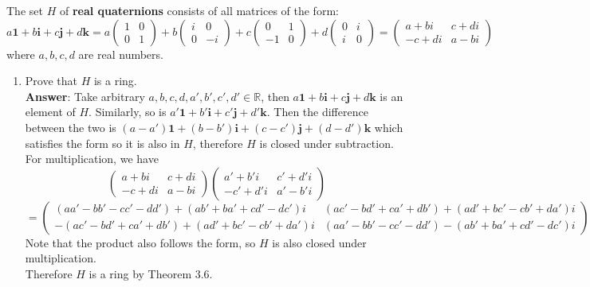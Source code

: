 \documentclass{article}
\begin{document}
\begin{enumerate}
            The set $H$ of {\bf real quaternions} consists of all matrices of the form:
            \[
                  a\textbf{1}+b\textbf{i}+c\textbf{j}+d\textbf{k} = a\begin{pmatrix}1&0\\0&1\end{pmatrix}+b\begin{pmatrix}i&0\\0&-i\end{pmatrix}+c\begin{pmatrix}0&1\\-1&0\end{pmatrix}+d\begin{pmatrix}0&i\\i&0\end{pmatrix}
                  = \begin{pmatrix}a+bi&c+di\\-c+di&a-bi\end{pmatrix}
            \]
            where $a,b,c,d$ are real numbers.
            \begin{enumerate}[start=2]
                  \item Prove that $H$ is a ring.\\
                        \textbf{Answer}: Take arbitrary $a,b,c,d,a',b',c',d'\in\mathbb{R}$, then $a\textbf{1}+b\textbf{i}+c\textbf{j}+d\textbf{k}$ is an element of $H$. Similarly, so is $a'\textbf{1}+b'\textbf{i}+c'\textbf{j}+d'\textbf{k}$. Then the difference between the two is $(a-a')\textbf{1}+(b-b')\textbf{i}+(c-c')\textbf{j}+(d-d')\textbf{k}$ which satisfies the form so it is also in $H$, therefore $H$ is closed under subtraction.\\
                        For multiplication, we have \[\begin{pmatrix}a+bi&c+di\\-c+di&a-bi\end{pmatrix}\begin{pmatrix}a'+b'i&c'+d'i\\-c'+d'i&a'-b'i\end{pmatrix}\]\[=\begin{pmatrix}(aa'-bb'-cc'-dd')+(ab'+ba'+cd'-dc')i&(ac'-bd'+ca'+db')+(ad'+bc'-cb'+da')i\\-(ac'-bd'+ca'+db')+(ad'+bc'-cb'+da')i&(aa'-bb'-cc'-dd')-(ab'+ba'+cd'-dc')i\end{pmatrix}\] Note that the product also follows the form, so $H$ is also closed under multiplication.\\
                        Therefore $H$ is a ring by Theorem 3.6.

\end{enumerate}
\end{enumerate}
\end{document}
